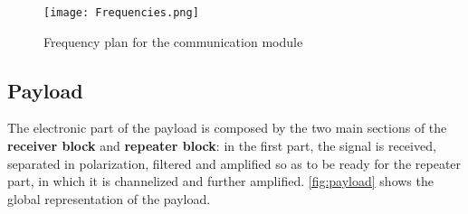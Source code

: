 \begin{figure}
\centering
\texttt{[image: Frequencies.png]}
\caption{Frequency plan for the communication module}
\label{fig:freqPlan}
\end{figure}

\subsection{Payload}
%
The electronic part of the payload is composed by the two main sections of the \textbf{receiver block} and \textbf{repeater block}: in the first part, the signal is received, separated in polarization, filtered and amplified so as to be ready for the repeater part, in which it is channelized and further amplified. \autoref{fig:payload} shows the global representation of the payload.


